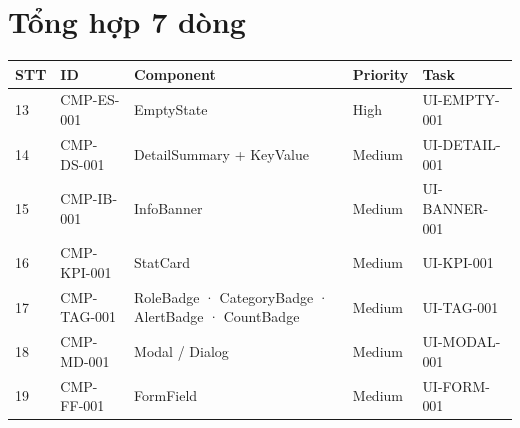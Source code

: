 \documentclass[11pt,a4paper]{report}
\begin{document}
\section*{Tổng hợp 7 dòng}
\begin{tabularx}{\textwidth}{@{}l l X l l@{}}\toprule
\textbf{STT} & \textbf{ID} & \textbf{Component} & \textbf{Priority} & \textbf{Task}\\\midrule
13 & CMP-ES-001 & EmptyState & High & UI-EMPTY-001\\
14 & CMP-DS-001 & DetailSummary + KeyValue & Medium & UI-DETAIL-001\\
15 & CMP-IB-001 & InfoBanner & Medium & UI-BANNER-001\\
16 & CMP-KPI-001 & StatCard & Medium & UI-KPI-001\\
17 & CMP-TAG-001 & RoleBadge · CategoryBadge · AlertBadge · CountBadge & Medium & UI-TAG-001\\
18 & CMP-MD-001 & Modal / Dialog & Medium & UI-MODAL-001\\
19 & CMP-FF-001 & FormField & Medium & UI-FORM-001\\
\bottomrule\end{tabularx}
\end{document}
